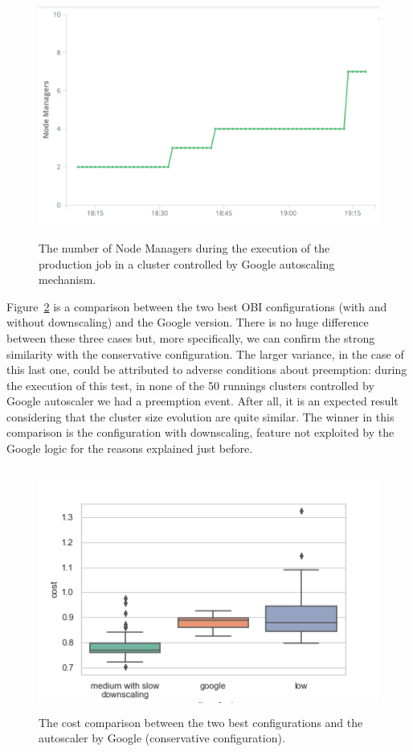 \documentclass[12pt,twoside,cucitura]{toptesi}
\begin{document}
\begin{figure}
\centering
\includegraphics[height=80mm]{google-size}
\caption{The number of Node Managers during the execution of the production job in a cluster controlled by Google autoscaling mechanism.}\label{fig:google-size}
\end{figure}

Figure~\ref{fig:google-cost} is a comparison between the two best OBI configurations (with and without downscaling) and the Google version. There is no huge difference between these three cases but, more specifically, we can confirm the strong similarity with the conservative configuration. The larger variance, in the case of this last one, could be attributed to adverse conditions about preemption: during the execution of this test, in none of the 50 runnings clusters controlled by Google autoscaler we had a preemption event. 
After all, it is an expected result considering that the cluster size evolution are quite similar. The winner in this comparison is the configuration with downscaling, feature not exploited by the Google logic for the reasons explained just before. 

\begin{figure}
\centering
\includegraphics[height=80mm]{google-cost}
\caption{The cost comparison between the two best configurations and the autoscaler by Google (conservative configuration).}\label{fig:google-cost}
\end{figure}
\end{document}
